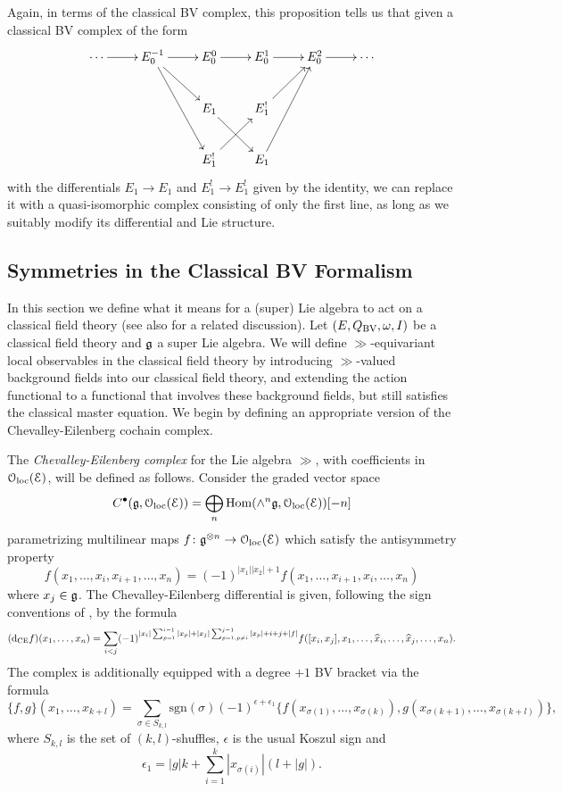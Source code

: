 \documentclass[10pt, oneside]{article}
\begin{document}
\begin{remark}
Again, in terms of the classical BV complex, this proposition tells us that given a classical BV complex of the form
\[\xymatrix{
\cdots \ar[r] & E_0^{-1}\ar[r] \ar[dr] \ar[ddr] &E_0^0 \ar[r]  &E_0^1 \ar[r] &E_0^2 \ar[r] &\cdots \\
&&E_1 \ar^{~}[dr] &E_1^! \ar[ur] && \\
&&E_1^! \ar^{~}[ur] &E_1 \ar[uur] && \\
}\]
with the differentials $E_1 \to E_1$ and $E_1^! \to E_1^!$ given by the identity, we can replace it with a quasi-isomorphic complex consisting of only the first line, as long as we suitably modify its differential and Lie structure. 
\end{remark}

\subsection{Symmetries in the Classical BV Formalism} \label{symmetry_section}
In this section we define what it means for a (super) Lie algebra to act on a classical field theory  (see also \cite[Chapter 11]{Book2} for a related discussion). Let $(E, Q_{\mathrm{BV}},\omega, I)$ be a classical field theory and $\mathfrak g$ a super Lie algebra.  We will define $\gg$-equivariant local observables in the classical field theory by introducing $\gg$-valued background fields into our classical field theory, and extending the action functional to a functional that involves these background fields, but still satisfies the classical master equation.  We begin by defining an appropriate version of the Chevalley-Eilenberg cochain complex.

\begin{definition}
The \emph{Chevalley-Eilenberg complex} for the Lie algebra $\gg$, with coefficients in $\mathcal{O}_{\rm loc}(\mathcal E)$, will be defined as follows.  Consider the graded vector space
\[C^\bullet(\mathfrak g, \mathcal{O}_{\rm loc}(\mathcal E)) = \bigoplus_n \operatorname{Hom}(\wedge^n \mathfrak g, \mathcal{O}_{\rm loc}(\mathcal E))[-n]\]
parametrizing multilinear maps $f\colon \mathfrak g^{\otimes n}\rightarrow \mathcal{O}_{\rm loc}(\mathcal E)$ which satisfy the antisymmetry property
\[f(x_1, \dots, x_i, x_{i+1}, \dots, x_n) = (-1)^{|x_1||x_2|+1} f(x_1, \dots, x_{i+1}, x_i, \dots, x_n)\]
where $x_j \in \mathfrak g$.  The Chevalley-Eilenberg differential is given, following the sign conventions of \cite{SafronovCoisoInt}, by the formula
\[({\rm d}_{\mathrm{CE}} f)(x_1, \dots, x_n) = \sum_{i < j}(-1)^{|x_i| \sum_{p=1}^{i-1} |x_p| + |x_j| \sum_{p=1,p\neq i}^{j-1} |x_p| +i+j+|f|} f([x_i, x_j], x_1, \dots, \widehat{x}_i, \dots, \widehat{x}_j, \dots, x_n).\]
The complex is additionally equipped with a degree $+1$ BV bracket via the formula
\[\{f, g\}(x_1, \dots, x_{k+l}) = \sum_{\sigma\in S_{k, l}} \mathrm{sgn}(\sigma) (-1)^{\epsilon+\epsilon_1} \{f(x_{\sigma(1)}, \dots, x_{\sigma(k)}), g(x_{\sigma(k+1)}, \dots, x_{\sigma(k+l)})\},\]
where $S_{k, l}$ is the set of $(k, l)$-shuffles, $\epsilon$ is the usual Koszul sign and
\[\epsilon_1 = |g|k + \sum_{i=1}^k |x_{\sigma(i)}|(l+|g|).\]
\end{definition}
\end{document}
